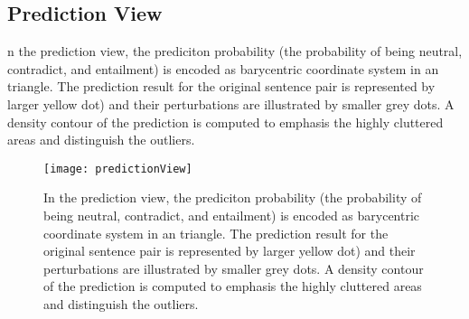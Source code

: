 \subsection{Prediction View}

n the prediction view, the prediciton probability (the probability of being neutral, contradict, and entailment) is encoded as barycentric coordinate system in an triangle.
The prediction result for the original sentence pair is represented by larger yellow dot) and their perturbations are illustrated by smaller grey dots.
A density contour of the prediction is computed to emphasis the highly cluttered areas and distinguish the outliers.

\begin{figure}[htbp]
\centering
\vspace{-2mm}
 \texttt{[image: predictionView]}
 \caption{
 In the prediction view, the prediciton probability (the probability of being neutral, contradict, and entailment) is encoded as barycentric coordinate system in an triangle.
 The prediction result for the original sentence pair is represented by larger yellow dot) and their perturbations are illustrated by smaller grey dots.
 A density contour of the prediction is computed to emphasis the highly cluttered areas and distinguish the outliers.
 }
\label{fig:modelPipeline}
\end{figure}
